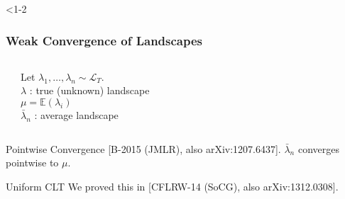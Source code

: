 \frame<1-2{
\frametitle{Weak Convergence of Landscapes}
\begin{columns}
    \begin{center}
%
    \end{center}
 \begin{block}{}
 Let $\lambda_1, \ldots, \lambda_n \sim \mathcal{L}_T$.\\ \pause
 $\lambda$ : true (unknown) landscape\\
  $\mu = \mathbb{E}(\lambda_i)  $\\ \pause
 $\bar{\lambda}_n$ : average landscape \pause
\end{block}
\end{columns}

\begin{block}{Pointwise Convergence  [B-2015 (JMLR), also arXiv:1207.6437].}
 {\color{red} $\bar{\lambda}_n$} converges pointwise to {\color{cyan} $\mu$}.
\end{block} \pause


\begin{block}{Uniform CLT}
We proved this in [CFLRW-14 (SoCG), also arXiv:1312.0308].
\end{block}


} %



